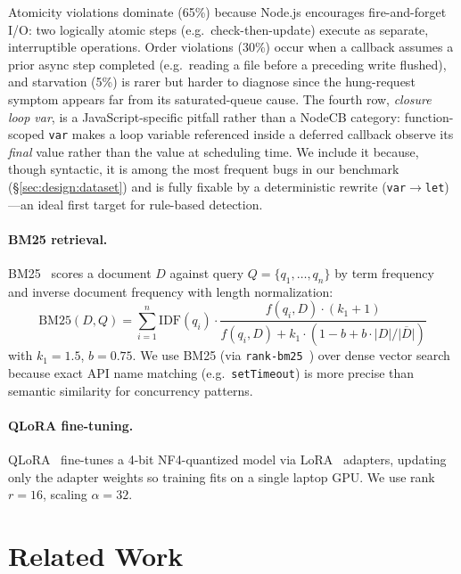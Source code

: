 \documentclass[runningheads]{llncs}
\begin{document}
Atomicity violations dominate (65\%) because Node.js encourages
fire-and-forget I/O: two logically atomic steps (e.g.\ check-then-update)
execute as separate, interruptible operations.
Order violations (30\%) occur when a callback assumes a prior async step
completed (e.g.\ reading a file before a preceding write flushed), and
starvation (5\%) is rarer but harder to diagnose since the hung-request
symptom appears far from its saturated-queue cause.
The fourth row, \emph{closure loop var}, is a JavaScript-specific pitfall
rather than a NodeCB category: function-scoped \texttt{var} makes a loop
variable referenced inside a deferred callback observe its \emph{final}
value rather than the value at scheduling time.
We include it because, though syntactic, it is among the most frequent
bugs in our benchmark (\S\ref{sec:design:dataset}) and is fully fixable by
a deterministic rewrite (\texttt{var}$\to$\texttt{let})---an ideal first
target for rule-based detection.

\paragraph{BM25 retrieval.}
BM25~\cite{bm25robertson} scores a document $D$ against query
$Q=\{q_1,\ldots,q_n\}$ by term frequency and inverse document frequency
with length normalization:
\[
  \text{BM25}(D, Q) = \sum_{i=1}^{n} \text{IDF}(q_i) \cdot
  \frac{f(q_i, D) \cdot (k_1 + 1)}{f(q_i, D) + k_1 \cdot (1 - b + b \cdot |D| / \overline{|D|})}
\]
with $k_1 = 1.5$, $b = 0.75$.
We use BM25 (via \texttt{rank-bm25}~\cite{rankbm25}) over dense vector
search because exact API name matching (e.g.\ \texttt{setTimeout}) is more
precise than semantic similarity for concurrency patterns.

\paragraph{QLoRA fine-tuning.}
QLoRA~\cite{qlora} fine-tunes a 4-bit NF4-quantized model via
LoRA~\cite{lora} adapters, updating only the adapter weights so training
fits on a single laptop GPU.
We use rank $r = 16$, scaling $\alpha = 32$.

\section{Related Work}
\label{sec:related}
\end{document}
